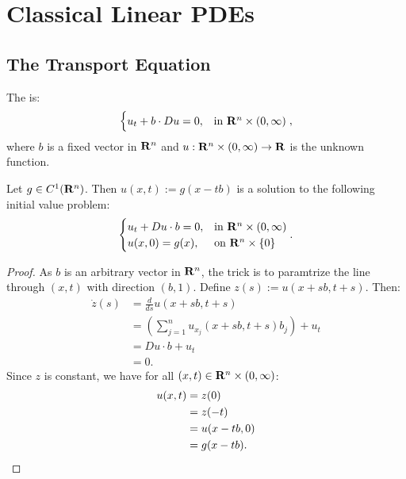 \chapter{Classical Linear PDEs}
\vspace{-25pt}

\section{The Transport Equation}
\begin{definition}
	The  is:
	\[
		\begin{cases}
			u_t + b \cdot Du = 0, & \text{in }\mathbf{R}^n \times (0,\infty)
		\end{cases},
	\] 
	where $b$ is a fixed vector in $\mathbf{R}^n$ and $u:\mathbf{R}^n \times (0,\infty) \rightarrow \mathbf{R}$ is the unknown function.
\end{definition}

\begin{theorem}
	Let $g \in C^1(\mathbf{R}^n)$. Then $u(x,t) := g(x-tb)$ is a solution to the following initial value problem:
	\[
		\begin{cases}
			u_t + Du \cdot b = 0, & \text{in }\mathbf{R}^n \times (0,\infty) \\
			u(x,0) = g(x),& \text{on }\mathbf{R}^n \times \{0\}
		\end{cases}.
	\] 
\end{theorem}
	\begin{proof}
		As $b$ is an arbitrary vector in $\mathbf{R}^n$, the trick is to paramtrize the line through $(x,t)$ with direction $(b,1)$. Define $z(s) := u(x+sb,t+s)$. Then:
		\begin{align*}
			\dot{z}(s)
			&= \frac{d}{ds} u(x+sb,t+s) \\
			&= \left(\sum_{j=1}^{n}u_{x_j}(x+sb,t+s)b_j \right) + u_t \\
			&= Du\cdot b + u_t \\
			&= 0.
		\end{align*}
		Since $z$ is constant, we have for all $(x,t) \in \mathbf{R}^n \times (0,\infty)$:
		\begin{align*}
			u(x,t)
			&= z(0) \\
			&= z(-t) \\
			&= u(x-tb,0) \\
			&= g(x-tb). \qedhere
		\end{align*}
	\end{proof}

